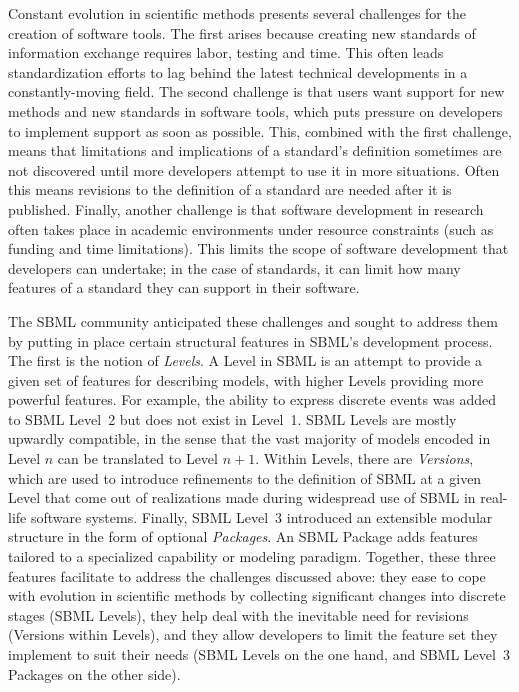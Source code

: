 \documentclass[]{draft-sbml-paper}
\begin{document}
Constant evolution in scientific methods presents several challenges for the creation of software tools.  The first arises because creating new standards of information exchange requires labor, testing and time.  This often leads standardization efforts to lag behind the latest technical developments in a constantly-moving field.  The second challenge is that users want support for new methods and new standards in software tools, which puts pressure on developers to implement support as soon as possible.  This, combined with the first challenge, means that limitations and implications of a standard's definition sometimes are not discovered until more developers attempt to use it in more situations.  Often this means revisions to the definition of a standard are needed after it is published.  Finally, another challenge is that software development in research often takes place in academic environments under resource constraints (such as funding and time limitations).  This limits the scope of software development that developers can undertake; in the case of standards, it can limit how many features of a standard they can support in their software.

The SBML community anticipated these challenges and sought to address them by putting in place certain structural features in SBML's development process.  The first is the notion of \emph{Levels}.  A Level in SBML is an attempt to provide a given set of features for describing models, with higher Levels providing more powerful features.  For example, the ability to express discrete events was added to SBML Level~2 but does not exist in Level~1.  SBML Levels are mostly upwardly compatible, in the sense that the vast majority of models encoded in Level $n$ can be translated to Level $n+1$.  Within Levels, there are \emph{Versions}, which are used to introduce refinements to the definition of SBML at a given Level that come out of realizations made during widespread use of SBML in real-life software systems.  Finally, SBML Level~3 introduced an extensible modular structure in the form of optional \emph{Packages}.  An SBML Package adds features tailored to a specialized capability or modeling paradigm.  Together, these three features facilitate to address the challenges discussed above: they ease to cope with evolution in scientific methods by collecting significant changes into discrete stages (SBML Levels), they help deal with the inevitable need for revisions (Versions within Levels), and they allow developers to limit the feature set they implement to suit their needs (SBML Levels on the one hand, and SBML Level~3 Packages on the other side).
\end{document}
